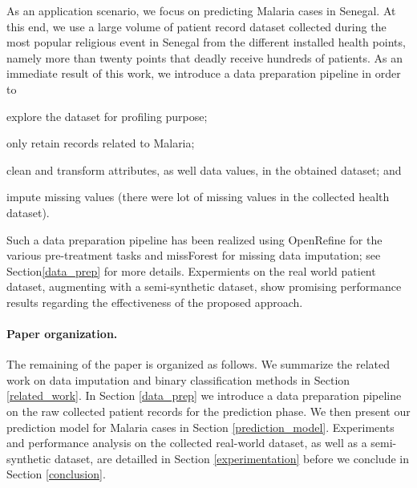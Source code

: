 As an application scenario, we focus on predicting Malaria cases in Senegal. At this end, we use  a large volume of patient record dataset collected during the most popular religious event in Senegal from the different installed health points, namely more than twenty points that deadly receive hundreds of patients.
As an immediate result of this work, we introduce a data preparation pipeline in order to 
\begin{inparaenum}[(i)]
\item explore the dataset for profiling purpose;
\item only retain records related to Malaria;
\item clean and transform attributes, as well data values, in the obtained dataset; and 
\item impute missing values (there were lot of missing values in the collected health dataset).
\end{inparaenum}
Such a data preparation pipeline has been realized using OpenRefine for the various pre-treatment tasks and missForest for missing data imputation; see Section\ref{data_prep} for more details. 
Expermients on the real world patient dataset, augmenting with a semi-synthetic dataset, show promising performance results regarding the effectiveness of the proposed approach.

\paragraph*{Paper organization.}The remaining of the paper is organized as follows. We summarize the related work on data imputation and binary classification methods in Section \ref{related_work}.
In Section \ref{data_prep} we introduce a data preparation pipeline on the raw collected patient records for the prediction phase. 
We then present our prediction model for Malaria cases in Section \ref{prediction_model}.
Experiments and performance analysis  on the collected real-world dataset, as well as a semi-synthetic dataset,  are detailled in Section \ref{experimentation} before we conclude in Section \ref{conclusion}. 
